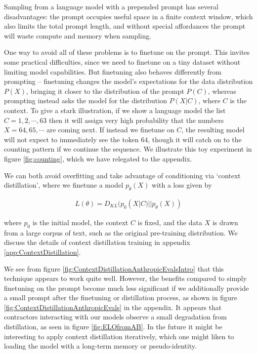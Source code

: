 Sampling from a language model with a prepended prompt has several disadvantages:  the prompt occupies useful space in a finite context window, which also limits the total prompt length, and without special affordances the prompt will waste compute and memory when sampling.

One way to avoid all of these problems is to finetune on the prompt.  This invites some practical difficulties, since we need to finetune on a tiny dataset without limiting model capabilities.  But finetuning also behaves differently from prompting -- finetuning changes the model's expectations for the data distribution $P(X)$, bringing it closer to the distribution of the prompt $P(C)$, whereas prompting instead asks the model for the distribution $P(X | C)$, where $C$ is the context.  To give a stark illustration, if we show a language model the list $C = 1,2, \cdots, 63$ then it will assign very high probability that the numbers $X = 64, 65, \cdots$ are coming next.  If instead we finetune on $C$, the resulting model will not expect to immediately see the token $64$, though it will catch on to the counting pattern if we continue the sequence.  We illustrate this toy experiment in figure \ref{fig:counting}, which we have relegated to the appendix.

We can both avoid overfitting and take advantage of conditioning via `context distillation', where we finetune a model $p_\theta(X)$ with a loss given by

\begin{eqnarray}
L(\theta) = D_{KL}(p_0(X | C) || p_\theta(X))
\end{eqnarray}

where $p_0$ is the initial model, the context $C$ is fixed, and the data $X$ is drawn from a large corpus of text, such as the original pre-training distribution.  We discuss the details of context distillation training in appendix  \ref{app:ContextDistillation}.  

We see from figure \ref{fig:ContextDistillationAnthropicEvalsIntro} that this technique appears to work quite well. However, the benefits compared to simply finetuning on the prompt become much less significant if we additionally provide a small prompt after the finetuning or distillation process, as shown in figure \ref{fig:ContextDistillationAnthropicEvals} in the appendix.  It appears that contractors interacting with our models observe a small degradation from distillation, as seen in figure \ref{fig:ELOfromAB}.  In the future it might be interesting to apply context distillation iteratively, which one might liken to loading the model with a long-term memory or pseudo-identity. 

